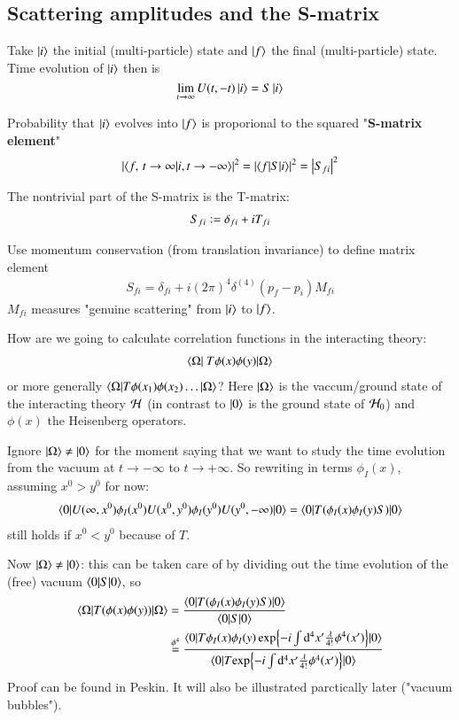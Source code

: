 \subsection{Scattering amplitudes and the S-matrix}
Take $\ket{i}$ the initial (multi-particle) state and $\ket{f}$ the final (multi-particle) state. Time evolution of $\ket{i}$ then is
$$\lim_{t\rightarrow\infty} U(t,-t) \ket{i} = S \ket{i}$$

Probability that $\ket{i}$ evolves into $\ket{f}$ is proporional to the squared "\textbf{S-matrix element}"
\begin{align}
	\left|	\braket{f,\, t\to \infty | i, t\rightarrow - \infty}\right|^2 = \left| \braket{f|S|i} \right|^2 = \left| S_{fi} \right|^2
\end{align}

The nontrivial part of the S-matrix is the T-matrix:
\begin{align}
	S_{fi} \vcentcolon = \delta_{fi} + iT_{fi}
\end{align}

Use momentum conservation (from translation invariance) to define matrix element
\begin{align}
	S_{fi} = \delta_{fi} + i(2\pi)^4 \delta^{(4)}(p_f - p_i) M_{fi}
\end{align}
$M_{fi}$ measures "genuine scattering" from $\ket{i}$ to $\ket{f}$.

How are we going to calculate correlation functions in the interacting theory:
\begin{align*}
	\braket{\Omega |  \ T \phi(x)\phi(y) | \Omega}	
\end{align*}
or more generally $\braket{\Omega | T \phi(x_1)\phi(x_2)\dots | \Omega}$? Here $\ket{\Omega}$ is the vaccum/ground state of the interacting theory $\mathcal{H}$ (in contrast to $\ket{0}$ is the ground state of $\mathcal{H}_0$) and $\phi(x)$ the Heisenberg operators.

Ignore $\ket{\Omega} \neq \ket{0}$ for the moment saying that we want to study the time evolution from the vacuum at $t\rightarrow - \infty$ to $t \rightarrow + \infty$. So rewriting in terms $\phi_I(x)$, assuming $x^0 > y^0$ for now:
\begin{align}
	\braket{0 | U(\infty, x^0) \phi_I(x^0)  U(x^0, y^0) \phi_I(y^0)U(y^0, -\infty) | 0}  = \braket{0|T(\phi_I(x)\phi_I(y)S)|0}
\end{align}
still holds if $x^0 < y^0$ because of $T$.

Now $\ket{\Omega} \neq \ket{0}$: this can be taken care of by dividing out the time evolution of the (free) vacuum $\braket{0|S|0}$, so
\begin{align}
	\braket{\Omega | T(\phi(x)\phi(y))|\Omega} &= \frac{\braket{0 | T(\phi_I(x)\phi_I(y)S)|0}}{\braket{0|S|0}} \\
	&\stackrel{\phi^4}{=} 
	\frac{\braket{0 | T {\phi_I(x)\phi_I(y)\exp{-i\int\dd^4x' \frac{\lambda}{4!}\phi^4(x')}}| 0}}
	{\braket{0 | T {\exp{-i\int\dd^4x' \frac{\lambda}{4!}\phi^4(x')}}| 0}
}\notag
\end{align}
Proof can be found in Peskin. It will also be illustrated parctically later ("vacuum bubbles").

